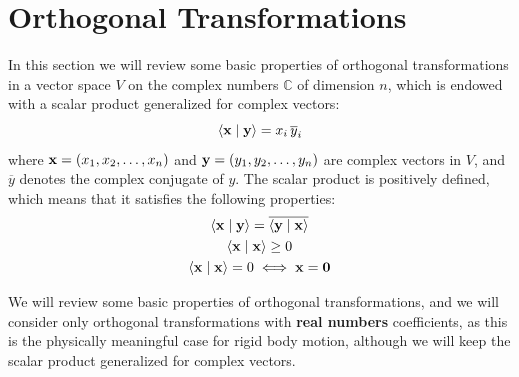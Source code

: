 \documentclass[12pt]{article}
\newcommand{\ip}[2]{\langle #1 \mid #2 \rangle}
\begin{document}
\section{Orthogonal Transformations}

In this section we will review some basic properties of orthogonal transformations in a
vector space $V$ on the complex numbers $\mathbb{C}$ of dimension $n$, which is endowed with
a scalar product generalized for complex vectors:
\begin{equation}
  \ip{\vb{x}}{\vb{y}} = x_i\,\overline{y}_i
\end{equation}
where $\vb{x} = (x_1, x_2, \ldots, x_n)$ and $\vb{y} = (y_1, y_2, \ldots, y_n)$ are complex
vectors in $V$, and $\overline{y}$ denotes the complex conjugate of $y$. The scalar product
is positively defined, which means that it satisfies the following properties:
\begin{equation}
  \begin{gathered}
    \ip{\vb{x}}{\vb{y}} = \overline{\ip{\vb{y}}{\vb{x}}} \\
    \ip{\vb{x}}{\vb{x}} \geq 0 \\
    \ip{\vb{x}}{\vb{x}} = 0 \iff \vb{x} = \vb{0}
  \end{gathered}
\end{equation}

We will review some basic properties of orthogonal transformations, and we will consider only
orthogonal transformations with \textbf{real numbers} coefficients, as this is the physically
meaningful case for rigid body motion, although we will keep the scalar product generalized
for complex vectors.
\end{document}
